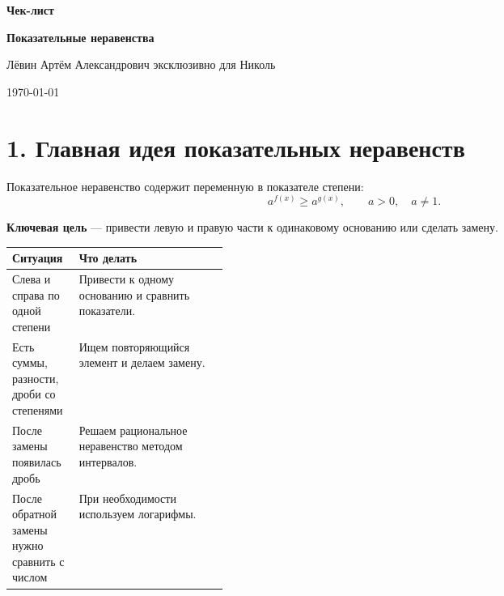 \documentclass[a4paper,12pt]{article}
\newcommand{\sectionline}{\vspace{2mm}{\color{accent}\hrule height 0.6pt}\vspace{2mm}}
\newcommand{\important}[1]{\textcolor{darkaccent}{\textbf{#1}}}
\begin{document}
\begin{titlepage}
\thispagestyle{empty}
\centering

\vspace*{28mm}

{\Huge\bfseries\textcolor{darkaccent}{Чек-лист}\par}
\vspace{5mm}
{\LARGE\bfseries Показательные неравенства\par}

\vspace{18mm}

{\large Лёвин Артём Александрович эксклюзивно для Николь\par}

\vspace{8mm}

{\large \today\par}

\vfill


\vspace*{12mm}
\end{titlepage}

\section*{1. Главная идея показательных неравенств}
\sectionline

Показательное неравенство содержит переменную в показателе степени:
\[
a^{f(x)} \ge a^{g(x)},\qquad a>0,\quad a\ne 1.
\]

\important{Ключевая цель} --- привести левую и правую части к одинаковому основанию или сделать замену.

\begin{center}
\renewcommand{\arraystretch}{1.35}
\begin{tabularx}{\linewidth}{@{}p{0.31\linewidth}X@{}}
\toprule
\textbf{Ситуация} & \textbf{Что делать} \\
\midrule
Слева и справа по одной степени & Привести к одному основанию и сравнить показатели. \\
Есть суммы, разности, дроби со степенями & Ищем повторяющийся элемент и делаем замену. \\
После замены появилась дробь & Решаем рациональное неравенство методом интервалов. \\
После обратной замены нужно сравнить с числом & При необходимости используем логарифмы. \\
\bottomrule
\end{tabularx}
\end{center}
\end{document}

